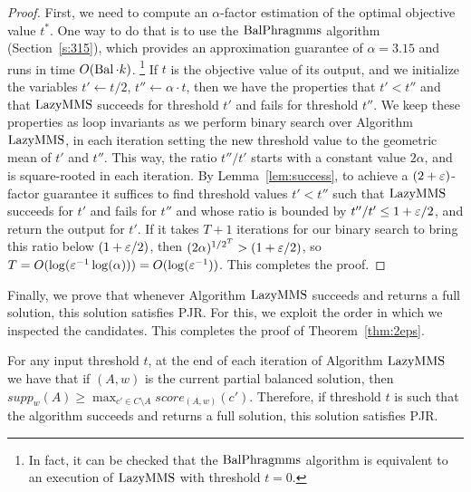 \begin{proof}
First, we need to compute an $\alpha$-factor estimation of the optimal objective value $t^*$. 
One way to do that is to use the $\operatorname{BalPhragmms}$ algorithm (Section~\ref{s:315}), which provides an approximation guarantee of $\alpha=3.15$ and runs in time $O(\operatorname{Bal}\cdot k)$.%
\footnote{In fact, it can be checked that the $\operatorname{BalPhragmms}$ algorithm is equivalent to an execution of $\operatorname{LazyMMS}$ with threshold $t=0$.} 
If $t$ is the objective value of its output, and we initialize the variables $t'\leftarrow t/2$, $t''\leftarrow \alpha\cdot t$, then we have the properties that $t'<t''$ and that $\operatorname{LazyMMS}$ succeeds for threshold $t'$ and fails for threshold $t''$. We keep these properties as loop invariants as we perform binary search over Algorithm $\operatorname{LazyMMS}$, in each iteration setting the new threshold value to the geometric mean of $t'$ and $t''$. This way, the ratio $t''/t'$ starts with a constant value $2 \alpha$, and is square-rooted in each iteration. 
By Lemma~\ref{lem:success}, to achieve a $(2+\varepsilon)$-factor guarantee it suffices to find threshold values $t'<t''$ such that $\operatorname{LazyMMS}$ succeeds for $t'$ and fails for $t''$ and whose ratio is bounded by $t''/t'\leq 1+\varepsilon/2$, and return the output for $t'$. If it takes $T+1$ iterations for our binary search to bring this ratio below $(1+\varepsilon/2)$, then $(2\alpha)^{1/2^T} > (1+\varepsilon/2)$, so $T= O(\log (\varepsilon^{-1} \log(\alpha))) = O(\log(\varepsilon^{-1}))$. This completes the proof. 
\end{proof}

Finally, we prove that whenever Algorithm $\operatorname{LazyMMS}$ succeeds and returns a full solution, this solution satisfies PJR. For this, we exploit the order in which we inspected the candidates. This completes the proof of Theorem~\ref{thm:2eps}. 

\begin{lemma}
For any input threshold $t$, at the end of each iteration of Algorithm $\operatorname{LazyMMS}$ we have that if $(A,w)$ is the current partial balanced solution, then $supp_w(A)\geq \max_{c'\in C\setminus A} score_{(A,w)}(c')$. 
Therefore, if threshold $t$ is such that the algorithm succeeds and returns a full solution, this solution satisfies PJR.
\end{lemma}

